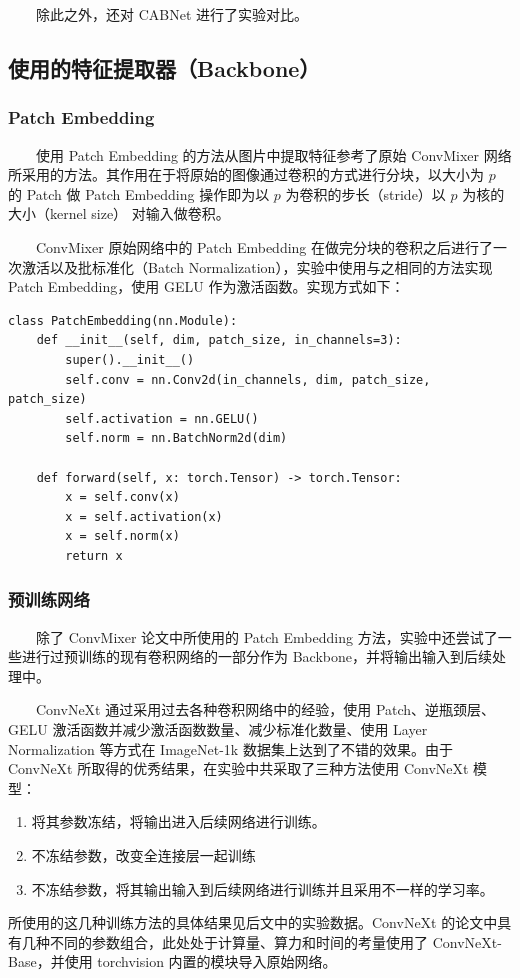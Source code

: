 \documentclass[twocolumn, fontsize=10pt]{article}
\begin{document}
　　除此之外，还对 CABNet\cite{he2021} 进行了实验对比。

\subsection{使用的特征提取器（Backbone）}

\subsubsection{Patch Embedding}

　　使用 Patch Embedding 的方法从图片中提取特征参考了原始 ConvMixer 网络所采用的方法。其作用在于将原始的图像通过卷积的方式进行分块，以大小为 $p$ 的 Patch 做 Patch Embedding 操作即为以 $p$ 为卷积的步长（stride）以 $p$ 为核的大小（kernel size） 对输入做卷积。

　　ConvMixer 原始网络\cite{trockman2022}中的 Patch Embedding 在做完分块的卷积之后进行了一次激活以及批标准化（Batch Normalization），实验中使用与之相同的方法实现 Patch Embedding，使用 GELU 作为激活函数。实现方式如下：
\begin{verbatim}
class PatchEmbedding(nn.Module):
    def __init__(self, dim, patch_size, in_channels=3):
        super().__init__()
        self.conv = nn.Conv2d(in_channels, dim, patch_size, patch_size)
        self.activation = nn.GELU()
        self.norm = nn.BatchNorm2d(dim)

    def forward(self, x: torch.Tensor) -> torch.Tensor:
        x = self.conv(x)
        x = self.activation(x)
        x = self.norm(x)
        return x
\end{verbatim}


\subsubsection{预训练网络}

　　除了 ConvMixer 论文中所使用的 Patch Embedding 方法，实验中还尝试了一些进行过预训练的现有卷积网络的一部分作为 Backbone，并将输出输入到后续处理中。

　　ConvNeXt 通过采用过去各种卷积网络中的经验，使用 Patch、逆瓶颈层、GELU 激活函数并减少激活函数数量、减少标准化数量、使用 Layer Normalization 等方式在 ImageNet-1k 数据集上达到了不错的效果\cite{liu2022}。由于 ConvNeXt 所取得的优秀结果，在实验中共采取了三种方法使用 ConvNeXt 模型：
  \begin{enumerate}
      \item 将其参数冻结，将输出进入后续网络进行训练。
      \item 不冻结参数，改变全连接层一起训练
      \item 不冻结参数，将其输出输入到后续网络进行训练并且采用不一样的学习率。
  \end{enumerate}
所使用的这几种训练方法的具体结果见后文中的实验数据。ConvNeXt 的论文中具有几种不同的参数组合，此处处于计算量、算力和时间的考量使用了 ConvNeXt-Base，并使用 torchvision 内置的模块导入原始网络。
\end{document}
